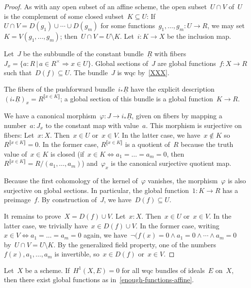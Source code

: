 \begin{proof}
  As with any open subset of an affine scheme, the open subset~$U \cap V$
  of~$U$ is the complement of some closed subset~$K \subseteq U$:
  If~$U \cap V = D(g_1) \cup \cdots \cup D(g_m)$ for some
  functions~$g_1,\ldots,g_m : U \to R$, we may set~$K = V(g_1,\ldots,g_m)$;
  then~$U \cap V = U \setminus K$. Let~$i : K \to X$ be the inclusion map.

  Let~$J$ be the subbundle of the constant bundle~$\underline{R}$ with
  fibers~$J_x = \{ a : R \,|\, a \in R^\times \Rightarrow x \in U \}$.
  Global sections of~$J$ are global functions~$f : X \to R$ such that~$D(f)
  \subseteq U$. The bundle~$J$ is wqc by~\cref{XXX}.

  The fibers of the pushforward bundle~$i_*\underline{R}$ have the explicit
  description~$(i_*\underline{R})_x = R^{\llbracket x \in K \rrbracket}$; a
  global section of this bundle is a global function~$K \to R$.

  We have a canonical morphism~$\varphi : J \to i_*\underline{R}$, given on
  fibers by mapping a number~$a : J_x$ to the constant map with value~$a$. This
  morphism is surjective on fibers: Let~$x : X$. Then~$x \in U$ or~$x \in V$.
  In the latter case, we have~$x \not\in K$ so~$R^{\llbracket x \in K
  \rrbracket} = 0$. In the former case, $R^{\llbracket x \in K \rrbracket}$ is
  a quotient of~$R$ because the truth value of~$x \in K$ is closed (if~$x \in K
  \Leftrightarrow a_1 = \ldots = a_m = 0$, then~$R^{\llbracket x \in K
  \rrbracket} = R/(a_1,\ldots,a_m)$) and~$\varphi_x$ is the canonical
  surjective quotient map.

  Because the first cohomology of the kernel of~$\varphi$ vanishes, the
  morphism~$\varphi$ is also surjective on global sections. In particular, the
  global function~$1 : K \to R$ has a preimage~$f$. By construction of~$J$,
  we have~$D(f) \subseteq U$.

  It remains to prove~$X = D(f) \cup V$. Let~$x : X$. Then~$x \in U$ or~$x \in V$.
  In the latter case, we trivially have~$x \in D(f) \cup V$. In the former
  case, writing~$x \in V \Leftrightarrow a_1 = \ldots = a_m = 0$ again,
  we have~$\neg(f(x) = 0 \wedge a_1 = 0 \wedge \cdots \wedge a_m = 0$ by~$U
  \cap V = U \setminus K$. By the generalized field property, one of the
  numbers~$f(x), a_1, \ldots, a_m$ is invertible, so~$x \in D(f)$ or~$x \in V$.
\end{proof}

\begin{proposition}\label{serre-prop}
  Let~$X$ be a scheme. If~$H^1(X, E) = 0$ for all wqc bundles of ideals~$E$ on~$X$, then
  there exist global functions as in~\cref{enough-functions-affine}.
\end{proposition}

